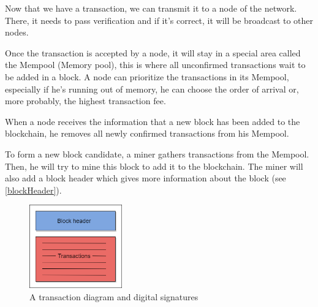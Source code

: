 Now that we have a transaction, we can transmit it to a node of the network. There, it needs to pass verification and if it's correct, it will be broadcast to other nodes. \newline

Once the transaction is accepted by a node, it will stay in a special area called the Mempool (Memory pool), this is where all unconfirmed transactions wait to be added in a block. A node can prioritize the transactions in its Mempool, especially if he's running out of memory, he can choose the order of arrival or, more probably, the highest transaction fee.

When a node receives the information that a new block has been added to the blockchain, he removes all newly confirmed transactions from his Mempool.  \newline

To form a new block candidate, a miner gathers transactions from the Mempool. Then, he will try to mine this block to add it to the blockchain. The miner will also add a block header which gives more information about the block (see \ref{blockHeader}). \newline

\begin{figure}[ht]
\centering
\includegraphics[width=4cm]{Figures/block}
\caption{A transaction diagram and digital signatures}
\end{figure}
\medskip


